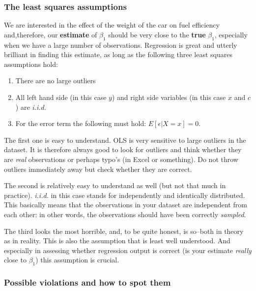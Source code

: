 \documentclass[]{article}
\providecommand{\tightlist}{%
  \setlength{\itemsep}{0pt}\setlength{\parskip}{0pt}}
\begin{document}
\subsubsection{The least squares
assumptions}\label{the-least-squares-assumptions}

We are interested in the effect of the weight of the car on fuel
efficiency and,therefore, our \textbf{estimate} of \(\beta_1\) should be
very close to the \textbf{true} \(\beta_1\), especially when we have a
large number of observations. Regression is great and utterly brilliant
in finding this estimate, as long as the following three least squares
assumptions hold:

\begin{enumerate}
\def\labelenumi{\arabic{enumi}.}
\tightlist
\item
  There are no large outliers
\item
  All left hand side (in this case \(y\)) and right side variables (in
  this case \(x\) and \(c\)) are \emph{i.i.d.}
\item
  For the error term the following must hold: \(E[\epsilon|X=x] = 0\).
\end{enumerate}

The first one is easy to understand. OLS is very sensitive to large
outliers in the dataset. It is therefore always good to look for
outliers and think whether they are \emph{real} observations or perhaps
typo's (in Excel or something). Do not throw outliers immediately away
but check whether they are correct.

The second is relatively easy to understand as well (but not that much
in practice). \emph{i.i.d.} in this case stands for independently and
identically distributed. This basically means that the observations in
your dataset are independent from each other: in other words, the
observations should have been correctly \emph{sampled}.

The third looks the most horrible, and, to be quite honest, is so--both
in theory as in reality. This is also the assumption that is least well
understood. And especially in assessing whether regression output is
correct (is your estimate \emph{really} close to \(\beta_1\)) this
assumption is crucial.

\subsubsection{Possible violations and how to spot
them}\label{possible-violations-and-how-to-spot-them}
\end{document}
